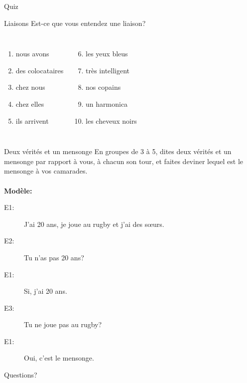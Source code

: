\documentclass{beamer}
\begin{document}
  \begin{frame}{}
    \begin{center}
      \Large Quiz
    \end{center}
  \end{frame}

  \begin{frame}{Liaisons}
    Est-ce que vous entendez une liaison?
    \begin{columns}
        \begin{enumerate}
          \item nous avons \underline{}
          \item des colocataires \underline{\uncover<3->{non}}
          \item chez nous \underline{}
          \item chez elles \underline{\uncover<5->{oui}}
          \item ils arrivent \underline{}
        \end{enumerate}
        \begin{enumerate}
          \setcounter{enumi}{5}
          \item les yeux bleus \underline{\uncover<7->{oui}}
          \item très intelligent \underline{}
          \item nos copains \underline{}
          \item un harmonica \underline{}
          \item les cheveux noirs \underline{}
        \end{enumerate}
    \end{columns}
  \end{frame}

  \begin{frame}{Deux vérités et un mensonge }
    En groupes de 3 à 5, dites deux vérités et un mensonge par rapport à vous, à chacun son tour, et faites deviner lequel est le mensonge à vos camarades. \\
     \\
    \textbf{Modèle:} \\
    \begin{description}
      \item[E1:] J'ai 20 ans, je joue au rugby et j'ai des sœurs.
      \item[E2:] Tu n'as pas 20 ans?
      \item[E1:] Si, j'ai 20 ans.
      \item[E3:] Tu ne joue pas au rugby?
      \item[E1:] Oui, c'est le mensonge.
    \end{description}
  \end{frame}

  \begin{frame}{}
    \begin{center}
      \Large Questions?
    \end{center}
  \end{frame}
\end{document}
